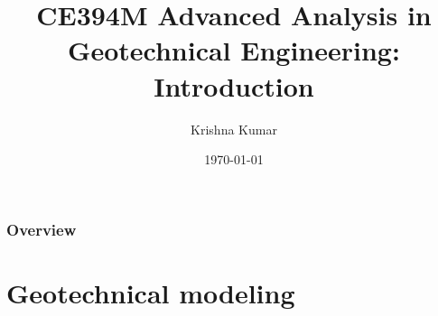 \documentclass[beamer]{beamer}
\title[CE394M: Intro to geotech analysis]{CE394M Advanced Analysis in Geotechnical Engineering: Introduction}
\author{Krishna Kumar} %
\institute[UT Austin] %
{
University of Texas at Austin \\
\medskip
\textit{
  \url{krishnak@utexas.edu}} %
}
\date{\today} %
\begin{document}
\begin{frame}
\titlepage %
\end{frame}

\begin{frame}
 \frametitle{Overview}
 \tableofcontents
\end{frame}


\section{Geotechnical modeling}
\end{document}
